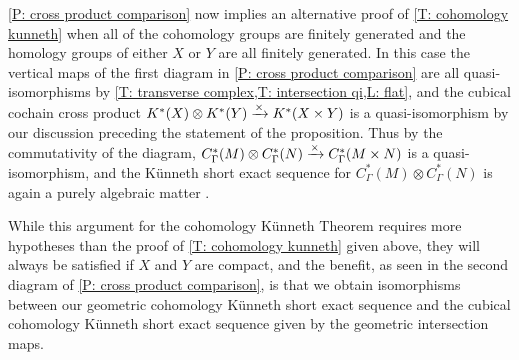\cref{P: cross product comparison} now implies an alternative proof of \cref{T: cohomology kunneth} when all of the cohomology groups are finitely generated and the homology groups of either $X$ or $Y$ are all finitely generated.
In this case the vertical maps of the first diagram in \cref{P: cross product comparison} are all quasi-isomorphisms by \cref{T: transverse complex,T: intersection qi,L: flat}, and the
cubical cochain cross product $K^*(X) \otimes K^*(Y) \xrightarrow{\times} K^*(X \times Y)$ is a quasi-isomorphism by our discussion preceding the statement of the proposition.
Thus by the commutativity of the diagram, $C^*_{\Gamma}(M) \otimes C^*_{\Gamma}(N) \xrightarrow{\times}  C^*_{\Gamma}(M \times N)$ is a quasi-isomorphism, and the K\"unneth short exact sequence for $C^*_{\Gamma}(M) \otimes C^*_{\Gamma}(N)$ is again a purely algebraic matter \cite[Theorem V.2.1]{HS}.

While this argument for the cohomology K\"unneth Theorem requires more hypotheses than the proof of \cref{T: cohomology kunneth} given above, they will always be satisfied if $X$ and $Y$ are compact, and the benefit, as seen in the second diagram of \cref{P: cross product comparison}, is that we obtain isomorphisms between our geometric cohomology K\"unneth short exact sequence and the cubical cohomology K\"unneth short exact sequence given by the geometric intersection maps.





